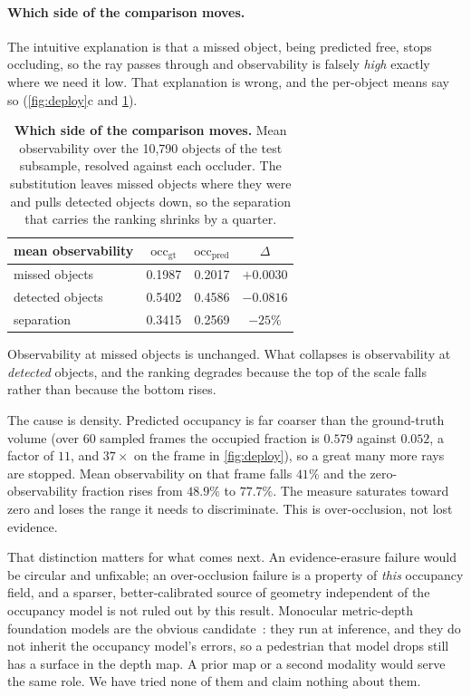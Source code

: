\documentclass[10pt,twocolumn,letterpaper]{article}
\begin{document}
\paragraph{Which side of the comparison moves.} The intuitive explanation
is that a missed object, being predicted free, stops occluding, so the ray
passes through and observability is falsely \emph{high} exactly where we
need it low. That explanation is wrong, and the per-object means say so
(\cref{fig:deploy}c and \cref{tab:whichmoves}).

\begin{table}[t]
\centering\small
\begin{tabular}{lccc}
\toprule
mean observability & $\text{occ}_{\text{gt}}$ & $\text{occ}_{\text{pred}}$ & $\Delta$ \\
\midrule
missed objects   & 0.1987 & 0.2017 & $+0.0030$ \\
detected objects & 0.5402 & 0.4586 & $\mathbf{-0.0816}$ \\
\midrule
separation       & 0.3415 & 0.2569 & $-25\%$ \\
\bottomrule
\end{tabular}
\caption{\textbf{Which side of the comparison moves.} Mean observability over the 10{,}790 objects of the test subsample, resolved against each occluder. The substitution leaves missed objects where they were and pulls detected objects down, so the separation that carries the ranking shrinks by a quarter.}
\label{tab:whichmoves}
\end{table}

Observability at missed objects is unchanged. What collapses is
observability at \emph{detected} objects, and the ranking degrades because
the top of the scale falls rather than because the bottom rises.

The cause is density. Predicted occupancy is far coarser than the
ground-truth volume (over 60 sampled frames the occupied fraction is
$0.579$ against $0.052$, a factor of $11$, and $37\times$ on the frame in
\cref{fig:deploy}), so a great many more rays are stopped. Mean
observability on that frame falls $41\%$ and the zero-observability
fraction rises from $48.9\%$ to $77.7\%$. The measure saturates toward zero
and loses the range it needs to discriminate. This is over-occlusion, not
lost evidence.

That distinction matters for what comes next. An evidence-erasure failure
would be circular and unfixable; an over-occlusion failure is a property of
\emph{this} occupancy field, and a sparser, better-calibrated source of geometry independent of the
occupancy model is not ruled out by this result. Monocular metric-depth
foundation models are the obvious candidate~\cite{bochkovskii2024depthpro,
hu2024metric3dv2, depthanyprior2025}: they run at inference, and
they do not inherit the occupancy model's errors, so a pedestrian that
model drops still has a surface in the depth map. A prior map or a second
modality would serve the same role. We have tried none of them and claim
nothing about them.
\end{document}
